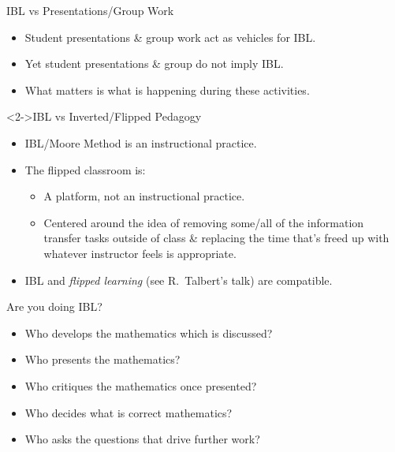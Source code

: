 \documentclass[10pt,handout]{beamer}
\begin{document}

\begin{frame}

\begin{block}{IBL vs Presentations/Group Work}
\begin{itemize}
\item Student presentations \& group work act as vehicles for IBL. 
\item Yet student presentations \& group do not imply IBL. 
\item What matters is what is happening during these activities.
\end{itemize}
\end{block}

\begin{block}<2->{IBL vs Inverted/Flipped Pedagogy}
\begin{itemize}
\item<2-> IBL/Moore Method is an instructional practice.
\item<2-> The flipped classroom is:
    \begin{itemize}\normalsize
    \item<2-> A platform, not an instructional practice. 
    \item<2-> Centered around the idea of removing some/all of the information transfer tasks outside of class \& replacing the time that's freed up with whatever instructor feels is appropriate.
    \end{itemize}
\item<2-> IBL and \emph{flipped learning} (see R.~Talbert's talk) are compatible.
\end{itemize}
\end{block}

\end{frame}


\begin{frame}

\begin{block}{Are you doing IBL?}
\begin{itemize}
\item<2-> Who develops the mathematics which is discussed?
\item<3-> Who presents the mathematics?
\item<4-> Who critiques the mathematics once presented?
\item<5-> Who decides what is correct mathematics?
\item<6-> Who asks the questions that drive further work?
\end{itemize}
\end{block}

\end{frame}
\end{document}
